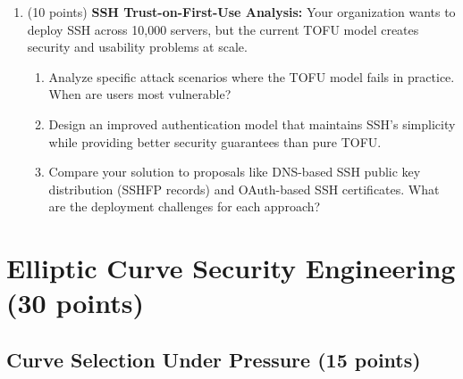 \documentclass[10pt,a4paper,american]{exam}
\begin{document}
\begin{enumerate}
	\item (10 points) \textbf{SSH Trust-on-First-Use Analysis:}
	      Your organization wants to deploy SSH across 10,000 servers, but the current TOFU model creates security and usability problems at scale.
	      \begin{enumerate}
		      \item Analyze specific attack scenarios where the TOFU model fails in practice. When are users most vulnerable?
		      \item Design an improved authentication model that maintains SSH's simplicity while providing better security guarantees than pure TOFU.
		      \item Compare your solution to proposals like DNS-based SSH public key distribution (SSHFP records) and OAuth-based SSH certificates. What are the deployment challenges for each approach?
	      \end{enumerate}
\end{enumerate}

\clearpage

\section{Elliptic Curve Security Engineering (30 points)}

\subsection{Curve Selection Under Pressure (15 points)}
\end{document}
